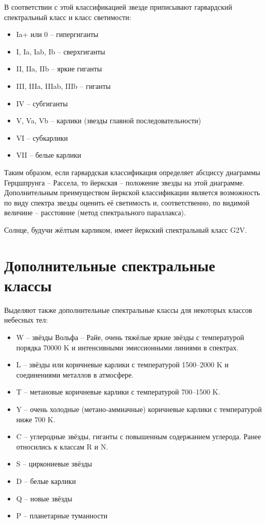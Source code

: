 \documentclass[12pt,a4paper]{article}
\begin{document}
В соответствии с этой классификацией звезде приписывают гарвардский спектральный класс и класс светимости:
\begin{itemize}
\item Ia+ или 0 -- гипергиганты
\item I, Ia, Iab, Ib -- сверхгиганты
\item II, IIa, IIb -- яркие гиганты
\item III, IIIa, IIIab, IIIb -- гиганты
\item IV -- субгиганты
\item V, Va, Vb -- карлики (звезды главной последовательности)
\item VI -- субкарлики
\item VII -- белые карлики
\end{itemize}

Таким образом, если гарвардская классификация определяет абсциссу диаграммы Герцшпрунга -- Рассела, то йеркская -- положение звезды на этой диаграмме. Дополнительным преимуществом йеркской классификации является возможность по виду спектра звезды оценить её светимость и, соответственно, по видимой величине -- расстояние (метод спектрального параллакса).

Солнце, будучи жёлтым карликом, имеет йеркский спектральный класс G2V.

\section{Дополнительные спектральные классы}

Выделяют также дополнительные спектральные классы для некоторых классов небесных тел:

\begin{itemize}
\item W -- звёзды Вольфа -- Райе, очень тяжёлые яркие звёзды с температурой порядка 70000 K и интенсивными эмиссионными линиями в спектрах.
\item L -- звёзды или коричневые карлики с температурой 1500--2000 K и соединениями металлов в атмосфере.
\item T -- метановые коричневые карлики с температурой 700--1500 K.
\item Y -- очень холодные (метано-аммиачные) коричневые карлики с температурой ниже 700 K.
\item C -- углеродные звёзды, гиганты с повышенным содержанием углерода. Ранее относились к классам R и N.
\item S -- циркониевые звёзды
\item D -- белые карлики
\item Q -- новые звёзды
\item P -- планетарные туманности
\end{itemize}
\end{document}
